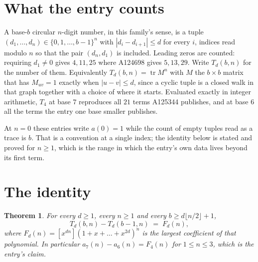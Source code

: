 \documentclass[11pt,a4paper]{article}
\theoremstyle{plain}
\newtheorem{theorem}{Theorem}
\theoremstyle{definition}
\begin{document}
\section{What the entry counts}

A base-$b$ circular $n$-digit number, in this family's sense, is a tuple
$(d_1,\dots,d_n)\in\{0,1,\dots,b-1\}^{n}$ with $|d_i-d_{i+1}|\le d$ for every $i$, indices
read modulo $n$ so that the pair $(d_n,d_1)$ is included. Leading zeros are counted: requiring
$d_1\ne0$ gives $4,11,25$ where A124698 gives $5,13,29$. Write $T_d(b,n)$ for the number of
them. Equivalently $T_d(b,n)=\operatorname{tr}M^{n}$ with $M$ the $b\times b$ matrix that has
$M_{uv}=1$ exactly when $|u-v|\le d$, since a cyclic tuple is a closed walk in that graph
together with a choice of where it starts. Evaluated exactly in integer arithmetic, $T_{4}$
at base $7$ reproduces all $21$ terms A125344 publishes, and at base $6$ all the
terms the entry one base smaller publishes.

At $n=0$ these entries write $a(0)=1$ while the count of empty tuples read as a trace is $b$.
That is a convention at a single index; the identity below is stated and proved for $n\ge1$,
which is the range in which the entry's own data lives beyond its first term.

\section{The identity}

\begin{theorem}
For every $d\ge1$, every $n\ge1$ and every $b\ge d\lfloor n/2\rfloor+1$,
\[
T_d(b,n)-T_d(b-1,n)\;=\;F_d(n),
\]
where $F_d(n)=[x^{dn}](1+x+\dots+x^{2d})^{n}$ is the largest coefficient of that
polynomial. In particular $a_{7}(n)-a_{6}(n)=F_{4}(n)$ for $1\le n\le3$, which
is the entry's claim.
\end{theorem}
\end{document}
